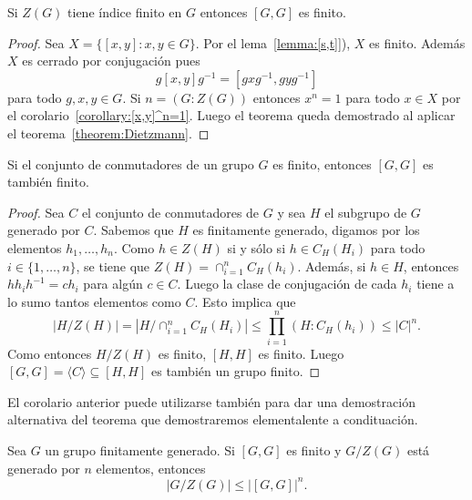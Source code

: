 \begin{theorem}[Schur]
	\label{theorem:Schur_commutador}
	Si $Z(G)$ tiene índice finito en $G$ entonces $[G,G]$ es finito.
\end{theorem}

\begin{proof}
	Sea $X=\{[x,y]:x,y\in G\}$. Por el lema~\ref{lemma:[s,t]}), $X$ es finito.
	Además $X$ es cerrado por conjugación pues
	\[
		g[x,y]g^{-1}=[gxg^{-1},gyg^{-1}]
	\]
	para todo $g,x,y\in G$. Si $n=(G:Z(G))$ entonces $x^n=1$ para todo $x\in X$
	por el corolario~\ref{corollary:[x,y]^n=1}. Luego el teorema queda demostrado 
	al aplicar el teorema~\ref{theorem:Dietzmann}.
\end{proof}

\begin{corollary}[Sury]
	Si el conjunto de conmutadores de un grupo $G$ es finito, entonces
	$[G,G]$ es también finito.
\end{corollary}

\begin{proof}
	Sea $C$ el conjunto de conmutadores de $G$ y sea $H$ el subgrupo de $G$
	generado por $C$. Sabemos que $H$ es finitamente generado, digamos por los elementos 
	$h_1,\dots,h_n$. Como $h\in Z(H)$ si y sólo si $h\in C_H(H_i)$ para todo
	$i\in\{1,\dots,n\}$, se tiene que $Z(H)=\cap_{i=1}^n C_H(h_i)$. Además, si
	$h\in H$, entonces $hh_ih^{-1}=ch_i$ para algún $c\in C$. Luego la clase de
	conjugación de cada $h_i$ tiene a lo sumo tantos elementos como $C$. Esto
	implica que
	\[
		|H/Z(H)|=|H/\cap_{i=1}^n C_H(H_i)|\leq\prod_{i=1}^n (H:C_H(h_i))\leq |C|^n.
	\]
	Como entonces $H/Z(H)$ es finito, $[H,H]$ es finito. Luego 
	$[G,G]=\langle C\rangle\subseteq [H,H]$ 
	es también un grupo finito.
\end{proof}

El corolario anterior puede utilizarse también para dar una demostración
alternativa del teorema que demostraremos elementalente a condituación. 

\begin{theorem}
	Sea $G$ un grupo finitamente generado. Si $[G,G]$ es finito y $G/Z(G)$ está generado por 
	$n$ elementos, entonces 
	\[
	|G/Z(G)|\leq |[G,G]|^n. 
	\]
\end{theorem}

